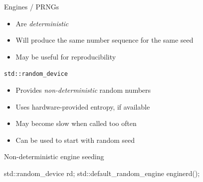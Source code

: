 \begin{frame}[fragile]
  \begin{block}{Engines / PRNGs}
    \begin{itemize}
      \item Are \emph{deterministic}
      \item Will produce the same number sequence for the same seed
      \item May be useful for reproducibility
    \end{itemize}
  \end{block}
  \begin{block}{\texttt{std::random\_device}}
    \begin{itemize}
      \item Provides \emph{non-deterministic} random numbers
      \item Uses hardware-provided entropy, if available
      \item May become slow when called too often
      \item Can be used to start with random seed
    \end{itemize}
  \end{block}
  \begin{exampleblock}{Non-deterministic engine seeding}
    \begin{cppcode}
      std::random_device rd;
      std::default_random_engine engine{rd()};
    \end{cppcode}
  \end{exampleblock}
\end{frame}

